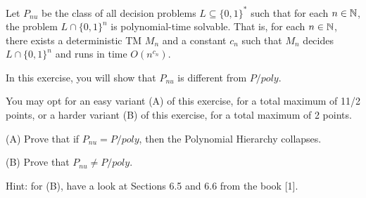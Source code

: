 \begin{question}
    Let  $P_{nu}$ be the class of all decision
    problems $L \subseteq \{0, 1\}^*$
    such that for each $n \in \mathbb{N}$,
    the problem $L \cap \{0, 1\}^n$
    is polynomial-time solvable.
    That is, for each $n \in \mathbb{N}$,
    there exists a deterministic TM $M_n$
    and a constant $c_n$ such that
    $M_n$ decides $L \cap \{0, 1\}^n$ and
    runs in time $O(n^{c_n})$.
    \par In this exercise, you will show that $P_{nu}$
    is different from $P/poly$.
    \par You may opt for an easy variant (A) of this
    exercise, for a total maximum of 11/2 points,
    or a harder variant (B) of this exercise,
    for a total maximum of 2 points.
    \par (A) Prove that if $P_{nu} = P/poly$,
    then the Polynomial Hierarchy collapses.
    \par (B) Prove that $P_{nu} \neq P/poly$.
    \par Hint: for (B), have a look at Sections 6.5 and 6.6 from the book [1].


\end{question}
